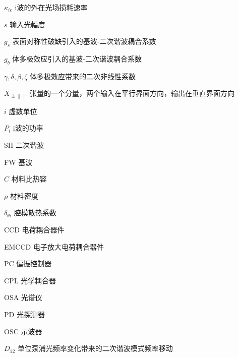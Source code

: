 \begin{denotation}[3cm]
\item[$\kappa_{ie}$] i波的外在光场损耗速率
\item[$s$] 输入光幅度
\item[$g_s$] 表面对称性破缺引入的基波-二次谐波耦合系数
\item[$g_b$] 体多极效应引入的基波-二次谐波耦合系数
\item[$\gamma, \delta, \beta, \zeta$] 体多极效应带来的二次非线性系数
\item[$X_{\perp \parallel \parallel}$] 张量的一个分量，两个输入在平行界面方向，输出在垂直界面方向
\item[$i$] 虚数单位
\item[$P_i$] i波的功率
\item[SH] 二次谐波
\item[FW] 基波
\item[$C$] 材料比热容
\item[$\rho$] 材料密度
\item[$\delta_{\theta i}$] 腔模散热系数
\item[CCD] 电荷耦合器件
\item[EMCCD] 电子放大电荷耦合器件
\item[PC] 偏振控制器
\item[CPL] 光学耦合器
\item[OSA] 光谱仪
\item[PD] 光探测器
\item[OSC] 示波器
\item[$D_{12}$] 单位泵浦光频率变化带来的二次谐波模式频率移动

\end{denotation}
